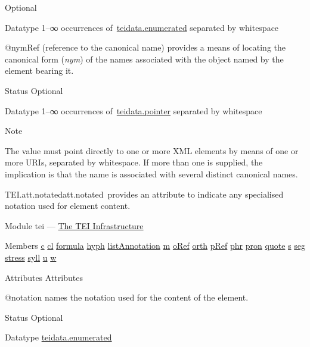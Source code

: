 \begin{reflist}
\begin{sansreflist}
\begin{reflist}
  Optional
    \item[{Datatype}]
  1–∞ occurrences of \hyperref[TEI.teidata.enumerated]{teidata.enumerated} separated by whitespace
\end{reflist}  
    \item[@nymRef]
  (reference to the canonical name) provides a means of locating the canonical form (\textit{nym}) of the names associated with the object named by the element bearing it.
\begin{reflist}
    \item[{Status}]
  Optional
    \item[{Datatype}]
  1–∞ occurrences of \hyperref[TEI.teidata.pointer]{teidata.pointer} separated by whitespace
    \item[{Note}]
  \par
The value must point directly to one or more XML elements by means of one or more URIs, separated by whitespace. If more than one is supplied, the implication is that the name is associated with several distinct canonical names.
\end{reflist}  
\end{sansreflist}  
\end{reflist}  
\begin{reflist}
\item[]\begin{specHead}{TEI.att.notated}{att.notated} provides an attribute to indicate any specialised notation used for element content.\end{specHead} 
    \item[{Module}]
  tei — \hyperref[ST]{The TEI Infrastructure}
    \item[{Members}]
  \hyperref[TEI.c]{c} \hyperref[TEI.cl]{cl} \hyperref[TEI.formula]{formula} \hyperref[TEI.hyph]{hyph} \hyperref[TEI.listAnnotation]{listAnnotation} \hyperref[TEI.m]{m} \hyperref[TEI.oRef]{oRef} \hyperref[TEI.orth]{orth} \hyperref[TEI.pRef]{pRef} \hyperref[TEI.phr]{phr} \hyperref[TEI.pron]{pron} \hyperref[TEI.quote]{quote} \hyperref[TEI.s]{s} \hyperref[TEI.seg]{seg} \hyperref[TEI.stress]{stress} \hyperref[TEI.syll]{syll} \hyperref[TEI.u]{u} \hyperref[TEI.w]{w}
    \item[{Attributes}]
  Attributes\hfil\\[-10pt]\begin{sansreflist}
    \item[@notation]
  names the notation used for the content of the element.
\begin{reflist}
    \item[{Status}]
  Optional
    \item[{Datatype}]
  \hyperref[TEI.teidata.enumerated]{teidata.enumerated}
\end{reflist}  
\end{sansreflist}  
\end{reflist}  
